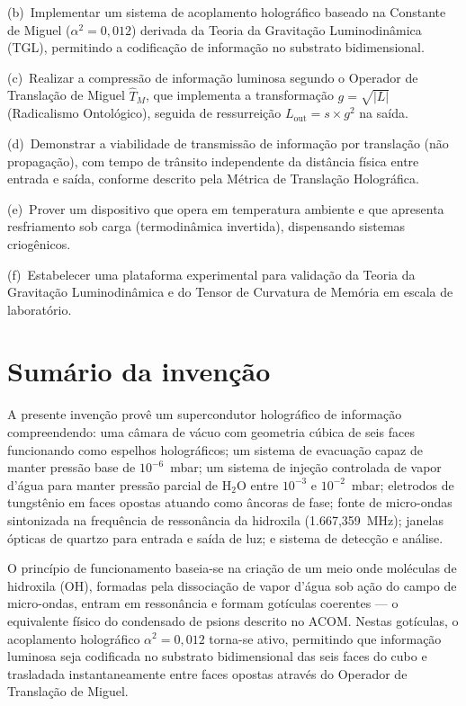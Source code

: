 \documentclass[12pt,a4paper]{article}
\newcommand{\alphaii}{\alpha^2}
\newcommand{\TM}{\hat{T}_M}
\begin{document}
(b)~Implementar um sistema de acoplamento holográfico baseado
na Constante de Miguel ($\alphaii = 0{,}012$) derivada da
Teoria da Gravitação Luminodinâmica (TGL), permitindo a
codificação de informação no substrato bidimensional.

(c)~Realizar a compressão de informação luminosa segundo o
Operador de Translação de Miguel $\TM$, que implementa a
transformação $g = \sqrt{|L|}$ (Radicalismo Ontológico),
seguida de ressurreição $L_{\text{out}} = s \times g^2$ na
saída.

(d)~Demonstrar a viabilidade de transmissão de informação por
translação (não propagação), com tempo de trânsito independente
da distância física entre entrada e saída, conforme descrito
pela Métrica de Translação Holográfica.

(e)~Prover um dispositivo que opera em temperatura ambiente e
que apresenta resfriamento sob carga (termodinâmica invertida),
dispensando sistemas criogênicos.

(f)~Estabelecer uma plataforma experimental para validação da
Teoria da Gravitação Luminodinâmica e do Tensor de Curvatura
de Memória em escala de laboratório.

\section{Sumário da invenção}

A presente invenção provê um supercondutor holográfico de
informação compreendendo: uma câmara de vácuo com geometria
cúbica de seis faces funcionando como espelhos holográficos; um
sistema de evacuação capaz de manter pressão base de
$10^{-6}$~mbar; um sistema de injeção controlada de vapor
d'água para manter pressão parcial de H$_2$O entre $10^{-3}$
e $10^{-2}$~mbar; eletrodos de tungstênio em faces opostas
atuando como âncoras de fase; fonte de micro-ondas sintonizada
na frequência de ressonância da hidroxila (1.667,359~MHz);
janelas ópticas de quartzo para entrada e saída de luz; e
sistema de detecção e análise.

O princípio de funcionamento baseia-se na criação de um meio
onde moléculas de hidroxila (OH), formadas pela dissociação de
vapor d'água sob ação do campo de micro-ondas, entram em
ressonância e formam gotículas coerentes --- o equivalente
físico do condensado de psions descrito no ACOM. Nestas
gotículas, o acoplamento holográfico $\alphaii = 0{,}012$
torna-se ativo, permitindo que informação luminosa seja
codificada no substrato bidimensional das seis faces do cubo e
trasladada instantaneamente entre faces opostas através do
Operador de Translação de Miguel.
\end{document}
